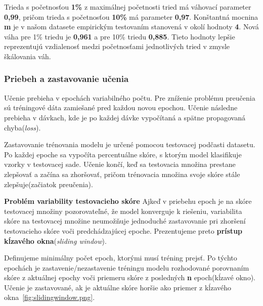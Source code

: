 Trieda s početnosťou \textbf{1\%} z maximálnej početnosti tried má váhovací parameter \textbf{0,99}, pričom trieda s početnosťou \textbf{10\%} má parameter \textbf{0,97}. Konštantná mocnina \textbf{m} je v našom datasete empirickým testovaním stanovená v okolí hodnoty \textbf{4}. Nová váha pre 1\% triedu je \textbf{0,961} a pre 10\% triedu \textbf{0,885}. Tieto hodnoty lepšie reprezentujú vzdialenosť medzi početnosťami jednotlivých tried v zmysle škálovania váh.


\subsubsection*{Priebeh a zastavovanie učenia}

Učenie prebieha v epochách variabilného počtu. Pre zníženie problému preučenia sú tréningové dáta zamiešané pred každou novou epochou. Učenie následne prebieha v dávkach, kde je po každej dávke vypočítaná a spätne propagovaná chyba(\textit{loss}).

Zastavovanie trénovania modelu je určené pomocou testovacej podčasti datasetu. Po každej epoche sa vypočíta percentuálne skóre, s ktorým model klasifikuje vzorky v testovacej sade. Učenie končí, keď sa testovacia množina prestane zlepšovať a začína sa zhoršovať, pričom trénovacia množina svoje skóre stále zlepšuje(začiatok preučenia).

\textbf{Problém variability testovacieho skóre}\newline
Ajkeď v priebehu epoch je na skóre testovacej množiny pozorovateľné, že model konverguje k riešeniu, variabilita skóre na testovacej množine neumožňuje jednoduché zastavovanie pri zhoršení testovacieho skóre voči predchádzajúcej epoche. Prezentujeme preto \textbf{prístup kĺzavého okna}(\textit{sliding window}).

Definujeme minimálny počet epoch, ktorými musí tréning prejsť. Po týchto epochách je zastavenie/nezastavenie tréningu modelu rozhodované porovnaním skóre z aktuálnej epochy voči priemeru skóre z posledných \textbf{n} epoch(kĺzavé okno). Učenie je zastavované, ak je aktuálne skóre horšie ako priemer z kĺzavého okna~\ref{fig:slidingwindow.png}.


